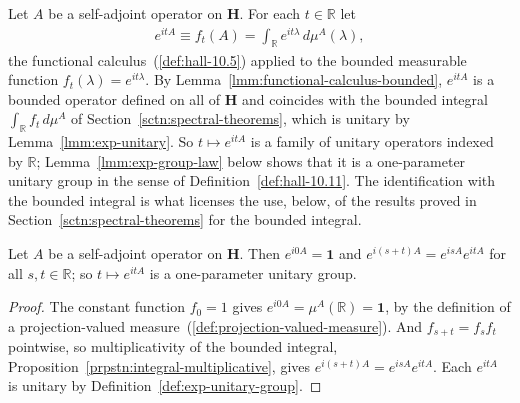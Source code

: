 \begin{definition}
    \label{def:exp-unitary-group}
    \leanok
    Let $A$ be a self-adjoint operator on $\mathbf{H}$. For each $t \in \mathbb{R}$ let
    \begin{align}
        e^{itA} \equiv f_t(A) = \int_{\mathbb{R}} e^{it\lambda} \, d\mu^A(\lambda),
    \end{align}
    the functional calculus~(\ref{def:hall-10.5}) applied to the bounded measurable function $f_t(\lambda) = e^{it\lambda}$. By Lemma~\ref{lmm:functional-calculus-bounded}, $e^{itA}$ is a bounded operator defined on all of $\mathbf{H}$ and coincides with the bounded integral $\int_{\mathbb{R}} f_t \, d\mu^A$ of Section~\ref{sctn:spectral-theorems}, which is unitary by Lemma~\ref{lmm:exp-unitary}. So $t \mapsto e^{itA}$ is a family of unitary operators indexed by $\mathbb{R}$; Lemma~\ref{lmm:exp-group-law} below shows that it is a one-parameter unitary group in the sense of Definition~\ref{def:hall-10.11}. The identification with the bounded integral is what licenses the use, below, of the results proved in Section~\ref{sctn:spectral-theorems} for the bounded integral.
\end{definition}

\begin{lemma}
    \label{lmm:exp-group-law}
    \leanok
    Let $A$ be a self-adjoint operator on $\mathbf{H}$. Then $e^{i0A} = \mathbf{1}$ and $e^{i(s+t)A} = e^{isA}e^{itA}$ for all $s, t \in \mathbb{R}$; so $t \mapsto e^{itA}$ is a one-parameter unitary group.
\end{lemma}
\begin{proof}
    \leanok
The constant function $f_0 = 1$ gives $e^{i0A} = \mu^A(\mathbb{R}) = \mathbf{1}$, by the definition of a projection-valued measure~(\ref{def:projection-valued-measure}). And $f_{s+t} = f_sf_t$ pointwise, so multiplicativity of the bounded integral, Proposition~\ref{prpstn:integral-multiplicative}, gives $e^{i(s+t)A} = e^{isA}e^{itA}$. Each $e^{itA}$ is unitary by Definition~\ref{def:exp-unitary-group}.
\end{proof}

